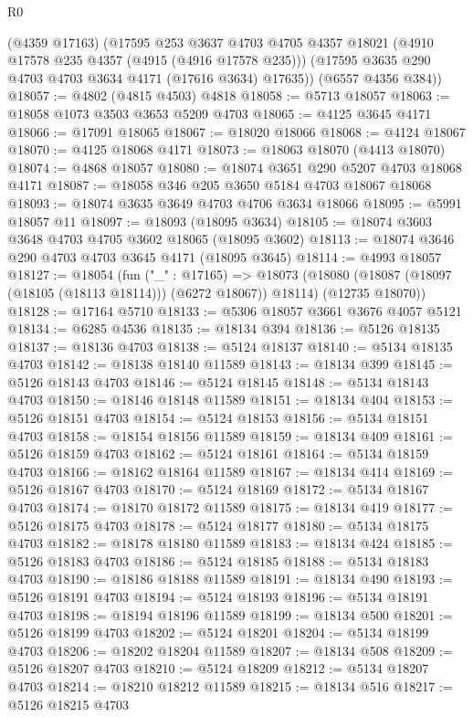 \begin{lexlean}{R0}
\begin{coremodule}
      (@4359 @17163)
      (@17595
        @253
        @3637
        @4703
        @4705
        @4357
        @18021
        (@4910 @17578 @235 @4357 (@4915 (@4916 @17578 @235)))
        (@17595 @3635 @290 @4703 @4703 @3634 @4171 (@17616 @3634) @17635))
      (@6557 @4356 @384))
@18057 := @4802 (@4815 @4503) @4818
@18058 := @5713 @18057
@18063 := @18058 @1073 @3503 @3653 @5209 @4703
@18065 := @4125 @3645 @4171
@18066 := @17091 @18065
@18067 := @18020 @18066
@18068 := @4124 @18067
@18070 := @4125 @18068 @4171
@18073 := @18063 @18070 (@4413 @18070)
@18074 := @4868 @18057
@18080 := @18074 @3651 @290 @5207 @4703 @18068 @4171
@18087 := @18058 @346 @205 @3650 @5184 @4703 @18067 @18068
@18093 := @18074 @3635 @3649 @4703 @4706 @3634 @18066
@18095 := @5991 @18057 @11
@18097 := @18093 (@18095 @3634)
@18105 := @18074 @3603 @3648 @4703 @4705 @3602 @18065 (@18095 @3602)
@18113 := @18074 @3646 @290 @4703 @4703 @3645 @4171 (@18095 @3645)
@18114 := @4993 @18057
@18127 := @18054
    (fun ("_" : @17165) =>
    @18073
      (@18080 (@18087 (@18097 (@18105 (@18113 @18114))) (@6272 @18067)) @18114)
      (@12735 @18070))
@18128 := @17164 @5710
@18133 := @5306 @18057 @3661 @3676 @4057 @5121
@18134 := @6285 @4536
@18135 := @18134 @394
@18136 := @5126 @18135
@18137 := @18136 @4703
@18138 := @5124 @18137
@18140 := @5134 @18135 @4703
@18142 := @18138 @18140 @11589
@18143 := @18134 @399
@18145 := @5126 @18143 @4703
@18146 := @5124 @18145
@18148 := @5134 @18143 @4703
@18150 := @18146 @18148 @11589
@18151 := @18134 @404
@18153 := @5126 @18151 @4703
@18154 := @5124 @18153
@18156 := @5134 @18151 @4703
@18158 := @18154 @18156 @11589
@18159 := @18134 @409
@18161 := @5126 @18159 @4703
@18162 := @5124 @18161
@18164 := @5134 @18159 @4703
@18166 := @18162 @18164 @11589
@18167 := @18134 @414
@18169 := @5126 @18167 @4703
@18170 := @5124 @18169
@18172 := @5134 @18167 @4703
@18174 := @18170 @18172 @11589
@18175 := @18134 @419
@18177 := @5126 @18175 @4703
@18178 := @5124 @18177
@18180 := @5134 @18175 @4703
@18182 := @18178 @18180 @11589
@18183 := @18134 @424
@18185 := @5126 @18183 @4703
@18186 := @5124 @18185
@18188 := @5134 @18183 @4703
@18190 := @18186 @18188 @11589
@18191 := @18134 @490
@18193 := @5126 @18191 @4703
@18194 := @5124 @18193
@18196 := @5134 @18191 @4703
@18198 := @18194 @18196 @11589
@18199 := @18134 @500
@18201 := @5126 @18199 @4703
@18202 := @5124 @18201
@18204 := @5134 @18199 @4703
@18206 := @18202 @18204 @11589
@18207 := @18134 @508
@18209 := @5126 @18207 @4703
@18210 := @5124 @18209
@18212 := @5134 @18207 @4703
@18214 := @18210 @18212 @11589
@18215 := @18134 @516
@18217 := @5126 @18215 @4703

\end{coremodule}
\end{lexlean}
